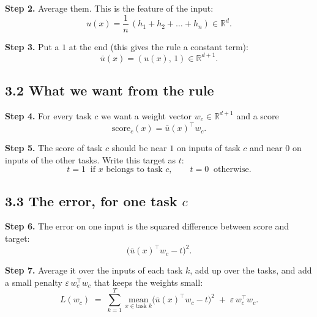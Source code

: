 \documentclass[11pt,a4paper]{article}
\newcommand{\step}[1]{\textbf{Step #1.}}
\newcommand{\ub}{\bar u}
\begin{document}
\step{2} Average them. This is the feature of the input:
\[ u(x) = \frac{1}{n}\,(h_1 + h_2 + \dots + h_n) \in \mathbb{R}^d . \]

\step{3} Put a $1$ at the end (this gives the rule a constant term):
\[ \ub(x) = (u(x),\, 1) \in \mathbb{R}^{d+1}. \]

\begin{center}
\end{center}

\subsection*{3.2 What we want from the rule}

\step{4} For every task $c$ we want a weight vector $w_c \in \mathbb{R}^{d+1}$ and a score
\[ \text{score}_c(x) = \ub(x)^{\top} w_c . \]

\step{5} The score of task $c$ should be near $1$ on inputs of task $c$ and near $0$ on inputs of the
other tasks. Write this target as $t$:
\[ t = 1 \ \text{ if } x \text{ belongs to task } c, \qquad t = 0 \ \text{ otherwise.} \]

\begin{center}
\end{center}

\subsection*{3.3 The error, for one task $c$}

\step{6} The error on one input is the squared difference between score and target:
\[ \bigl(\ub(x)^{\top} w_c - t\bigr)^2 . \]

\step{7} Average it over the inputs of each task $k$, add up over the tasks, and add a small penalty
$\varepsilon\,w_c^{\top}w_c$ that keeps the weights small:
\[ L(w_c) \;=\; \sum_{k=1}^{T}\ \underset{x \in \text{task } k}{\text{mean}} \bigl(\ub(x)^{\top} w_c - t\bigr)^2 \;+\; \varepsilon\, w_c^{\top} w_c . \]
\end{document}
